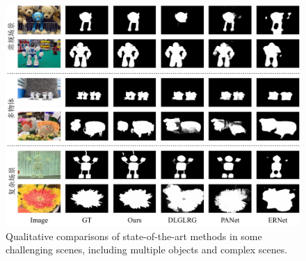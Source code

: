 

\begin{figure}
	\centering
	\includegraphics[width=\linewidth]{figures/chapter3/compare_1}
	\caption{
		Qualitative comparisons of state-of-the-art methods in some challenging scenes, including multiple objects and complex scenes.
	}
	\label{figure:figure_comparison_1}
	\vspace{-0.2cm}
\end{figure}


